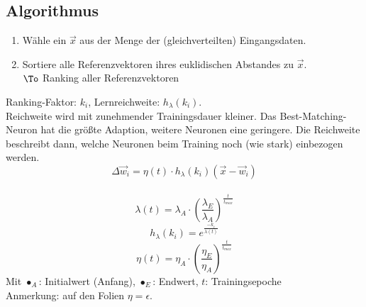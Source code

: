 \subsection{Algorithmus}
\begin{enumerate}
\item Wähle ein $\vec{x}$ aus der Menge der (gleichverteilten) Eingangsdaten.
\item Sortiere alle Referenzvektoren ihres euklidischen Abstandes zu $\vec{x}$.\\
$\To$ Ranking aller Referenzvektoren
\end{enumerate}
Ranking-Faktor: $k_i$, Lernreichweite: $h_\lambda(k_i)$.\\
Reichweite wird mit zunehmender Trainingsdauer kleiner. Das Best-Matching-Neuron hat die größte Adaption, weitere Neuronen eine geringere. Die Reichweite beschreibt dann, welche Neuronen beim Training noch (wie stark) einbezogen werden.
$$\Delta \vec{w}_i = \eta (t) \cdot h_\lambda(k_i) (\vec{x}-\vec{w}_i)$$\\
$$\lambda(t)=\lambda_{A}\cdot \left(\frac{\lambda_{E}}{\lambda_{A}}\right)^{\frac{t}{t_{max}}}$$
$$h_\lambda(k_i)=e^{\frac{-k_i}{\lambda(t)}}$$
$$\eta(t)=\eta_{A}\cdot \left(\frac{\eta_{E}}{\eta_{A}}\right)^{\frac{t}{t_{max}}}$$
Mit $\bullet_A$: Initialwert (Anfang), $\bullet_E$: Endwert, $t$: Trainingsepoche\\
Anmerkung: auf den Folien $\eta = \epsilon$.

